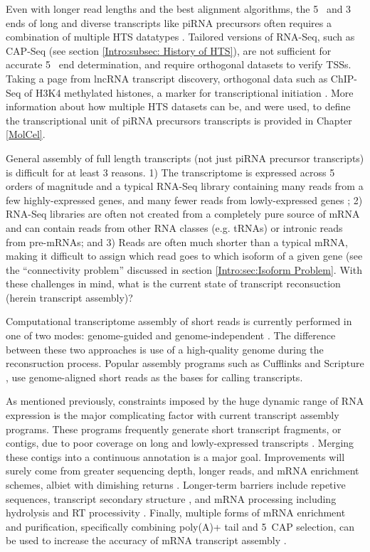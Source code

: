     Even with longer read lengths and the best alignment algorithms, the 5\textprime~ and 3\textprime~ ends of long and diverse transcripts like piRNA precursors often requires a combination of multiple HTS datatypes \citep{Blower2013}. Tailored versions of RNA-Seq, such as CAP-Seq (see section \ref{Intro:subsec: History of HTS}), are not sufficient for accurate 5\textprime~ end determination, and require orthogonal datasets to verify TSSs. Taking a page from lncRNA transcript discovery, orthogonal data such as ChIP-Seq of H3K4 methylated histones, a marker for transcriptional initiation \citep{Khalil2009}. More information about how multiple HTS datasets can be, and were used, to define the transcriptional unit of piRNA precursors transcripts is provided in Chapter \ref{MolCel}.

    General assembly of full length transcripts (not just piRNA precursor transcripts) is difficult for at least 3 reasons. 1) The transcriptome is expressed across 5 orders of magnitude and a typical RNA-Seq library containing many reads from a few highly-expressed genes, and many fewer reads from lowly-expressed genes \citep{Blencowe2009}; 2) RNA-Seq libraries are often not created from a completely pure source of mRNA and can contain reads from other RNA classes (e.g. tRNAs) or intronic reads from pre-mRNAs; and 3) Reads are often much shorter than a typical mRNA, making it difficult to assign which read goes to which isoform of a given gene (see the ``connectivity problem'' discussed in section \ref{Intro:sec:Isoform Problem}. With these challenges in mind, what is the current state of transcript reconsuction (herein transcript assembly)?

    Computational transcriptome assembly of short reads is currently performed in one of two modes: genome-guided and genome-independent \citep{Garber2011a}. The difference between these two approaches is use of a high-quality genome during the reconsruction process. Popular assembly programs such as Cufflinks \citep{Trapnell2010} and Scripture \citep{Guttman2010}, use genome-aligned short reads as the bases for calling transcripts.

    As mentioned previously, constraints imposed by the huge dynamic range of RNA expression is the major complicating factor with current transcript assembly programs. These programs frequently generate short transcript fragments, or contigs, due to poor coverage on long and lowly-expressed transcripts \citep{Rehrauer2013}. Merging these contigs into a continuous annotation is a major goal. Improvements will surely come from greater sequencing depth, longer reads, and mRNA enrichment schemes, albiet with dimishing returns \citep{Chang2014c}. Longer-term barriers include repetive sequences, transcript secondary structure \citep{Wan2014}, and mRNA processing including hydrolysis and RT processivity \citep{Sharon2013}. Finally, multiple forms of mRNA enrichment and purification, specifically combining poly(A)+ tail and 5\textprime~CAP selection, can be used to increase the accuracy of mRNA transcript assembly \citep{Blower2013}. 


